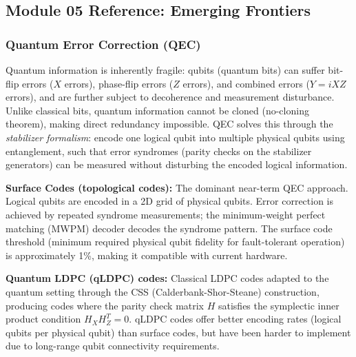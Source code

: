\documentclass[11pt,letterpaper]{article}
\begin{document}
\subsection{Module 05 Reference: Emerging Frontiers}

\subsubsection{Quantum Error Correction (QEC)}

Quantum information is inherently fragile: qubits (quantum bits) can suffer bit-flip errors ($X$ errors), phase-flip errors ($Z$ errors), and combined errors ($Y = iXZ$ errors), and are further subject to decoherence and measurement disturbance. Unlike classical bits, quantum information cannot be cloned (no-cloning theorem), making direct redundancy impossible. QEC solves this through the \textit{stabilizer formalism}: encode one logical qubit into multiple physical qubits using entanglement, such that error syndromes (parity checks on the stabilizer generators) can be measured without disturbing the encoded logical information.

\textbf{Surface Codes (topological codes):} The dominant near-term QEC approach. Logical qubits are encoded in a 2D grid of physical qubits. Error correction is achieved by repeated syndrome measurements; the minimum-weight perfect matching (MWPM) decoder decodes the syndrome pattern. The surface code threshold (minimum required physical qubit fidelity for fault-tolerant operation) is approximately 1\%, making it compatible with current hardware.

\textbf{Quantum LDPC (qLDPC) codes:} Classical LDPC codes adapted to the quantum setting through the CSS (Calderbank-Shor-Steane) construction, producing codes where the parity check matrix $H$ satisfies the symplectic inner product condition $H_X H_Z^T = 0$. qLDPC codes offer better encoding rates (logical qubits per physical qubit) than surface codes, but have been harder to implement due to long-range qubit connectivity requirements.
\end{document}
